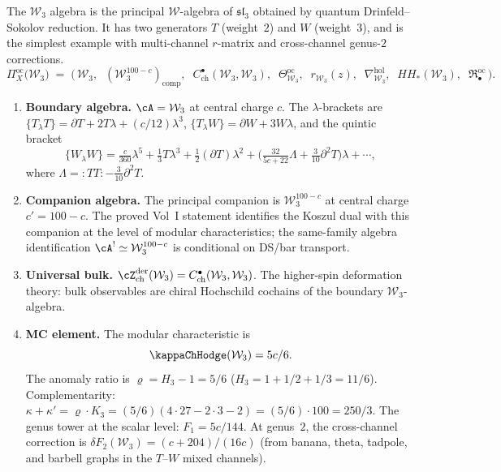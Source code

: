 \begin{computation}
\label{comp:platonic-W3}
The $\mathcal{W}_3$ algebra is the principal $\mathcal{W}$-algebra
of $\mathfrak{sl}_3$ obtained by quantum Drinfeld--Sokolov
reduction. It has two generators $T$ (weight~$2$) and $W$ (weight~$3$),
and is the simplest example with multi-channel $r$-matrix and
cross-channel genus-$2$ corrections.
\begin{equation}\label{eq:platonic-W3}
\Pi^{\mathrm{oc}}_X\!\bigl(\mathcal{W}_3\bigr)
\;=\;
\bigl(\,
\mathcal{W}_3,\;\;
(\mathcal{W}_3^{100-c})_{\mathrm{comp}},\;\;
C^\bullet_{\mathrm{ch}}(\mathcal{W}_3, \mathcal{W}_3),\;\;
\Theta^{\mathrm{oc}}_{\mathcal{W}_3},\;\;
r_{\mathcal{W}_3}(z),\;\;
\nabla^{\mathrm{hol}}_{\mathcal{W}_3},\;\;
HH_*(\mathcal{W}_3),\;\;
\mathfrak{R}^{\mathrm{oc}}_\bullet
\,\bigr).
\end{equation}
\begin{enumerate}[label=\textup{(\roman*)},nosep]
\item \textbf{Boundary algebra.}
 $\cA = \mathcal{W}_3$ at central charge $c$.
 The $\lambda$-brackets are
 $\{T_\lambda T\} = \partial T + 2T\lambda + (c/12)\lambda^3$,\;
 $\{T_\lambda W\} = \partial W + 3W\lambda$, and
 the quintic bracket
 \[
 \{W_\lambda W\}
 = \tfrac{c}{360}\lambda^5 + \tfrac{1}{3}T\lambda^3
 + \tfrac{1}{2}(\partial T)\lambda^2
 + \bigl(\tfrac{32}{5c+22}\Lambda + \tfrac{3}{10}\partial^2 T\bigr)\lambda
 + \cdots,
 \]
 where $\Lambda = {:}TT{:} - \tfrac{3}{10}\partial^2 T$.

\item \textbf{Companion algebra.}
 The principal companion is $\mathcal{W}_3^{100-c}$ at central
 charge $c' = 100 - c$. The proved Vol~I statement identifies
 the Koszul dual with this companion at the level of modular
 characteristics; the same-family algebra identification
 $\cA^! \simeq \mathcal{W}_3^{100-c}$ is conditional on DS/bar
 transport.

\item \textbf{Universal bulk.}
 $\cZ^{\mathrm{der}}_{\mathrm{ch}}(\mathcal{W}_3)
 = C^\bullet_{\mathrm{ch}}(\mathcal{W}_3, \mathcal{W}_3)$.
 The higher-spin deformation theory: bulk observables are
 chiral Hochschild cochains of the boundary $\mathcal{W}_3$-algebra.

\item \textbf{MC element.}
 The modular characteristic is
 \begin{equation}\label{eq:platonic-kappa-W3}
 \kappaChHodge(\mathcal{W}_3) = 5c/6.
 \end{equation}
 The anomaly ratio is $\varrho = H_3 - 1 = 5/6$
 \textup{(}$H_3 = 1 + 1/2 + 1/3 = 11/6$\textup{)}.
 Complementarity:
 $\kappa + \kappa' = \varrho \cdot K_3
 = (5/6)(4 \cdot 27 - 2 \cdot 3 - 2)
 = (5/6) \cdot 100 = 250/3$.
 The genus tower at the scalar level: $F_1 = 5c/144$.
 At genus~$2$, the cross-channel correction is
 $\delta F_2(\mathcal{W}_3) = (c + 204)/(16c)$
 \textup{(}from banana, theta, tadpole, and barbell graphs in the
 $T$--$W$ mixed channels\textup{)}.


\end{enumerate}
\end{computation}
